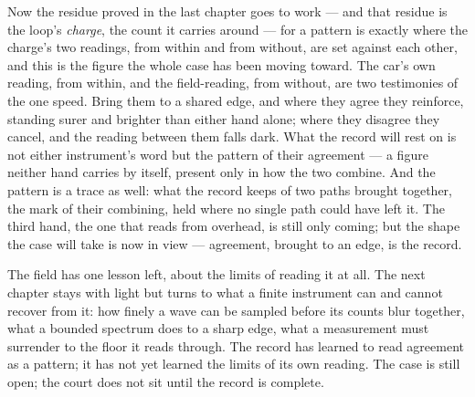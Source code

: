 Now the residue proved in the last chapter goes to work --- and that residue is the loop's \emph{charge}, the
count it carries around --- for a pattern is exactly where the charge's two readings, from within and from
without, are set against each other, and this is the figure the whole case has been moving toward. The car's
own reading, from within, and the field-reading, from without, are two testimonies of the one speed. Bring them
to a shared edge, and where they agree they reinforce, standing surer and brighter than either hand alone;
where they disagree they cancel, and the reading between them falls dark. What the record will rest on is not
either instrument's word but the pattern of their agreement --- a figure neither hand carries by itself,
present only in how the two combine. And the pattern is a trace as well: what the record keeps of two paths
brought together, the mark of their combining, held where no single path could have left it. The third hand,
the one that reads from overhead, is still only coming; but the shape the case will take is now in view ---
agreement, brought to an edge, is the record.

The field has one lesson left, about the limits of reading it at all. The next chapter stays with light but
turns to what a finite instrument can and cannot recover from it: how finely a wave can be sampled before its
counts blur together, what a bounded spectrum does to a sharp edge, what a measurement must surrender to the
floor it reads through. The record has learned to read agreement as a pattern; it has not yet learned the
limits of its own reading. The case is still open; the court does not sit until the record is complete.

